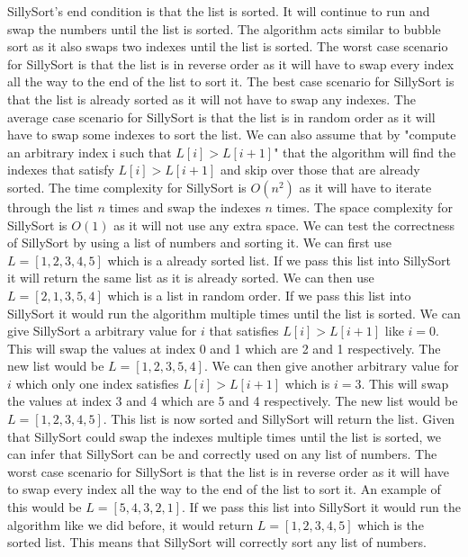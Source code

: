 \documentclass[12pt,letterpaper]{article}
\begin{document}
SillySort's end condition is that the list is sorted.
It will continue to run and swap the numbers until the list is sorted.
The algorithm acts similar to bubble sort as it also swaps two indexes until the list is sorted.
The worst case scenario for SillySort is that the list is in reverse order
as it will have to swap every index all the way to the end of the list to sort it.
The best case scenario for SillySort is that the list is already sorted as it will not have to swap any indexes.
The average case scenario for SillySort is that the list is in random order as it will have to swap some indexes to sort the list.
We can also assume that by "compute an arbitrary index i such that $L[i] > L[i+1]$" 
that the algorithm will find the indexes that satisfy $L[i] > L[i+1]$ and skip over those that are already sorted.
The time complexity for SillySort is $O(n^2)$ as it will
have to iterate through the list $n$ times and swap the indexes $n$ times.
The space complexity for SillySort is $O(1)$ as it will not use any extra space.
We can test the correctness of SillySort by using a list of numbers and sorting it.
We can first use $L = [1, 2, 3, 4, 5]$ which is a already sorted list. If we
pass this list into SillySort it will return the same list as it is already sorted.
We can then use $L = [2, 1, 3, 5, 4]$ which is a list in random order. If we
pass this list into SillySort it would run the algorithm multiple times until the list is sorted.
We can give SillySort a arbitrary value for $i$ that satisfies $L[i] > L[i+1]$ 
like $i = 0$. This will swap the values at index 0 and 1 which are 2 and 1 respectively.
The new list would be $L = [1, 2, 3, 5, 4]$. We can then give another arbitrary value for $i$ 
which only one index satisfies $L[i] > L[i+1]$ which is $i = 3$. This will swap the values at index 3 and 4
which are 5 and 4 respectively. The new list would be $L = [1, 2, 3, 4, 5]$. This list is now sorted and
SillySort will return the list. Given that SillySort could swap the indexes multiple times until the list is sorted,
we can infer that SillySort can be and correctly used on any list of numbers. The worst case scenario for SillySort
is that the list is in reverse order as it will have to swap every index all the way to the end of the list to sort it.
An example of this would be $L = [5, 4, 3, 2, 1]$. If we pass this list into SillySort it would run the algorithm
like we did before, it would return $L = [1, 2, 3, 4, 5]$ which is the sorted list. 
This means that SillySort will correctly sort any list of numbers.

\newpage
\end{document}
